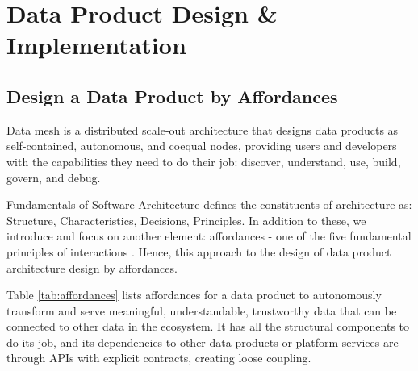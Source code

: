 \documentclass[12pt, a4paper]{book}
\begin{document}
\let\cleardoublepage\clearpage
\chapter{Data Product Design \& Implementation}
\section{Design a Data Product by Affordances}
Data mesh is a distributed scale-out architecture that designs data products as self-contained, autonomous, and coequal nodes, providing users and developers with the capabilities they need to do their job: discover, understand, use, build, govern, and debug.

Fundamentals of Software Architecture defines the constituents of architecture as: Structure, Characteristics, Decisions, Principles. In addition to these, we introduce and focus on another element: affordances - one of the five fundamental principles of interactions \cite{norman2002design}. Hence, this approach to the design of data product architecture design by affordances.

Table \ref{tab:affordances} lists affordances for a data product to autonomously transform and serve meaningful, understandable, trustworthy data that can be connected to other data in the ecosystem. It has all the structural components to do its job, and its dependencies to other data products or platform services are through APIs with explicit contracts, creating loose coupling.
\end{document}
